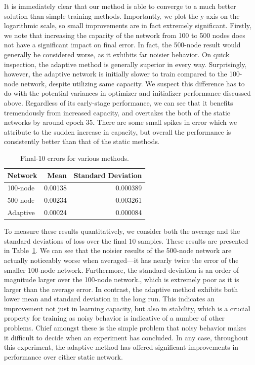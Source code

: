 It is immediately clear that our method is able to converge to a much better solution than simple training methods.
Importantly, we plot the y-axis on the logarithmic scale, so small improvements are in fact extremely significant.
Firstly, we note that increasing the capacity of the network from 100 to 500 nodes does not have a significant impact on final error.
In fact, the 500-node result would generally be considered worse, as it exhibits far noisier behavior.
On quick inspection, the adaptive method is generally superior in every way.
Surprisingly, however, the adaptive network is initially slower to train compared to the 100-node network, despite utilizing same capacity. 
We suspect this difference has to do with the potential variances in optimizer and initializer performance discussed above.
Regardless of its early-stage performance, we can see that it benefits tremendously from increased capacity, and overtakes the both of the static networks by around epoch 35.
There are some small spikes in error which we attribute to the sudden increase in capacity, but overall the performance is consistently better than that of the static methods.

\begin{table}[!htb]
\centering
\caption{Final-10 errors for various methods.}
\label{table:sin_errors}
\begin{tabular}{@{}lrr@{}}
\toprule
Network  & Mean    & Standard Deviation \\ \midrule
100-node & 0.00138 & 0.000389           \\
500-node & 0.00234 & 0.003261           \\
Adaptive & 0.00024 & 0.000084           \\ \bottomrule
\end{tabular}
\end{table}

To measure these results quantitatively, we consider both the average and the standard deviations of loss over the final 10 samples.
These results are presented in Table~\ref{table:sin_errors}.
We can see that the noisier results of the 500-node network are actually noticeably worse when averaged---it has nearly twice the error of the smaller 100-node network.
Furthermore, the standard deviation is an order of magnitude larger over the 100-node network., which is extremely poor as it is larger than the average error.
In contrast, the adaptive method exhibits both lower mean and standard deviation in the long run.
This indicates an improvement not just in learning capacity, but also in stability, which is a crucial property for training as noisy behavior is indicative of a number of other problems.
Chief amongst these is the simple problem that noisy behavior makes it difficult to decide when an experiment has concluded.
In any case, throughout this experiment, the adaptive method has offered significant improvements in performance over either static network.

